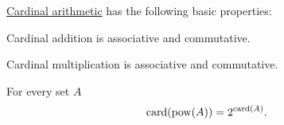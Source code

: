 \begin{proposition}\label{thm:cardinal_arithmetic_properties}
  \hyperref[def:cardinal_arithmetic]{Cardinal arithmetic} has the following basic properties:

  \begin{thmenum}
     Cardinal addition is associative and commutative.

     Cardinal multiplication is associative and commutative.

     For every set \( A \)
    \begin{equation*}
      \operatorname{card}(\operatorname{pow}(A)) = 2^{\operatorname{card}(A)}.
    \end{equation*}
  \end{thmenum}
\end{proposition}
